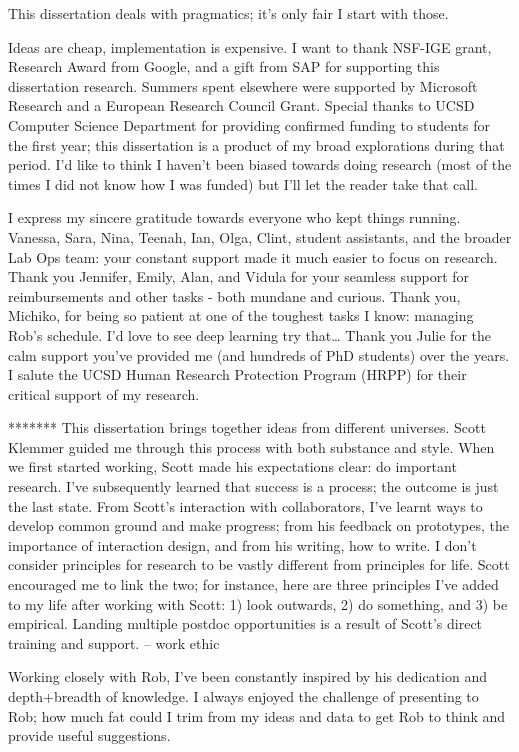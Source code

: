 \begin{frontmatter}
\begin{acknowledgements}
This dissertation deals with pragmatics; it’s only fair I start with those. 

Ideas are cheap, implementation is expensive. I want to thank NSF-IGE grant, Research Award from Google, and a gift from SAP for supporting this dissertation research. Summers spent elsewhere were supported by Microsoft Research and a European Research Council Grant. Special thanks to UCSD Computer Science Department for providing confirmed funding to students for the first year; this dissertation is a product of my broad explorations during that period. I’d like to think I haven’t been biased towards doing research (most of the times I did not know how I was funded) but I’ll let the reader take that call.

I express my sincere gratitude towards everyone who kept things running. Vanessa, Sara, Nina, Teenah, Ian, Olga, Clint, student assistants, and the broader Lab Ops team: your constant support made it much easier to focus on research. Thank you Jennifer, Emily, Alan, and Vidula for your seamless support for reimbursements and other tasks - both mundane and curious. Thank you, Michiko, for being so patient at one of the toughest tasks I know: managing Rob’s schedule. I’d love to see deep learning try that… Thank you Julie for the calm support you’ve provided me (and hundreds of PhD students) over the years. I salute the UCSD Human Research Protection Program (HRPP) for their critical support of my research.

*******
This dissertation brings together ideas from different universes. Scott Klemmer guided me through this process with both substance and style. When we first started working, Scott made his expectations clear: do important research. I’ve subsequently learned that success is a process; the outcome is just the last state. From Scott’s interaction with collaborators, I’ve learnt ways to develop common ground and make progress; from his feedback on prototypes, the importance of interaction design, and from his writing, how to write. I don’t consider principles for research to be vastly different from principles for life. Scott encouraged me to link the two; for instance, here are three principles I’ve added to my life after working with Scott: 1) look outwards, 2) do something, and 3) be empirical. Landing multiple postdoc opportunities is a result of Scott’s direct training and support.  -- work ethic

Working closely with Rob, I’ve been constantly inspired by his dedication and depth+breadth of knowledge. I always enjoyed the challenge of presenting to Rob; how much fat could I trim from my ideas and data to get Rob to think and provide useful suggestions. 


\end{acknowledgements}
\end{frontmatter}
